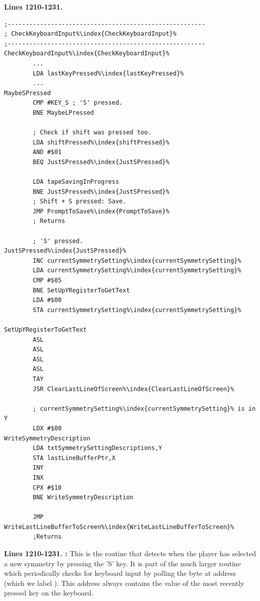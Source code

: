 \clearpage
\textbf{Lines 1210-1231. }
\begin{lstlisting}[escapechar=\%]
;-------------------------------------------------------
; CheckKeyboardInput%\index{CheckKeyboardInput}%
;-------------------------------------------------------
CheckKeyboardInput%\index{CheckKeyboardInput}%   
        ...
        LDA lastKeyPressed%\index{lastKeyPressed}%
        ...
MaybeSPressed   
        CMP #KEY_S ; 'S' pressed.
        BNE MaybeLPressed

        ; Check if shift was pressed too.
        LDA shiftPressed%\index{shiftPressed}%
        AND #$01
        BEQ JustSPressed%\index{JustSPressed}%

        LDA tapeSavingInProgress
        BNE JustSPressed%\index{JustSPressed}%
        ; Shift + S pressed: Save.
        JMP PromptToSave%\index{PromptToSave}%
        ; Returns

        ; 'S' pressed. 
JustSPressed%\index{JustSPressed}%   
        INC currentSymmetrySetting%\index{currentSymmetrySetting}%
        LDA currentSymmetrySetting%\index{currentSymmetrySetting}%
        CMP #$05
        BNE SetUpYRegisterToGetText
        LDA #$00
        STA currentSymmetrySetting%\index{currentSymmetrySetting}%

SetUpYRegisterToGetText   
        ASL 
        ASL 
        ASL 
        ASL 
        TAY 
        JSR ClearLastLineOfScreen%\index{ClearLastLineOfScreen}%

        ; currentSymmetrySetting%\index{currentSymmetrySetting}% is in Y
        LDX #$00
WriteSymmetryDescription   
        LDA txtSymmetrySettingDescriptions,Y
        STA lastLineBufferPtr,X
        INY 
        INX 
        CPX #$10
        BNE WriteSymmetryDescription

        JMP WriteLastLineBufferToScreen%\index{WriteLastLineBufferToScreen}%
        ;Returns
\end{lstlisting}
\clearpage

\textbf{Lines 1210-1231. :} This is the routine that detects when the player has selected a new
symmetry by pressing the 'S' key. It is part of the much larger routine  which periodically checks
for keyboard input by polling the byte at address  (which we label ). This address always
contains the value of the most recently pressed key on the keyboard.

